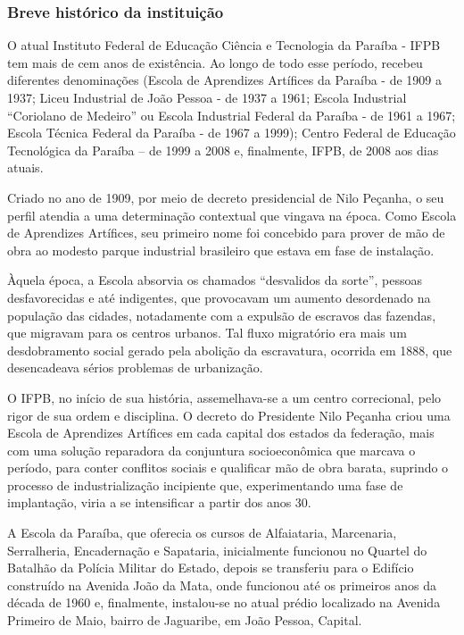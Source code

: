 \subsubsection{Breve hist\'orico da institui\c{c}\~ao}

	O atual Instituto Federal de Educação Ciência e Tecnologia da Paraíba - IFPB tem mais de cem anos de existência. Ao longo de todo esse período, recebeu diferentes denominações (Escola de Aprendizes Artífices da Paraíba - de 1909 a 1937; Liceu Industrial de João Pessoa - de 1937 a 1961; Escola Industrial ``Coriolano de Medeiro'' ou Escola Industrial Federal da Paraíba - de 1961 a 1967; Escola Técnica Federal da Paraíba - de 1967 a 1999); Centro Federal de Educação Tecnológica da Paraíba – de 1999 a 2008 e, finalmente, IFPB, de 2008 aos dias atuais.

	Criado no ano de 1909, por meio de decreto presidencial de Nilo Peçanha, o seu perfil atendia a uma determinação contextual que vingava na época. Como Escola de Aprendizes Artífices, seu primeiro nome foi concebido para prover de mão de obra ao modesto parque industrial brasileiro que estava em fase de instalação.

	Àquela época, a Escola absorvia os chamados ``desvalidos da sorte'', pessoas desfavorecidas e até indigentes, que provocavam um aumento desordenado na população das cidades, notadamente com a expulsão de escravos das fazendas, que migravam para os centros urbanos. Tal fluxo migratório era mais um desdobramento social gerado pela abolição da escravatura, ocorrida em 1888, que desencadeava sérios problemas de urbanização.

	O IFPB, no início de sua história, assemelhava-se a um centro correcional, pelo rigor de sua ordem e disciplina. O decreto do Presidente Nilo Peçanha criou uma Escola de Aprendizes Artífices em cada capital dos estados da federação, mais com uma solução reparadora da conjuntura socioeconômica que marcava o período, para conter conflitos sociais e qualificar mão de obra barata, suprindo o processo de industrialização incipiente que, experimentando uma fase de implantação, viria a se intensificar a partir dos anos 30.

	A Escola da Paraíba, que oferecia os cursos de Alfaiataria, Marcenaria, Serralheria, Encadernação e Sapataria, inicialmente funcionou no Quartel do Batalhão da Polícia Militar do Estado, depois se transferiu para o Edifício construído na Avenida João da Mata, onde funcionou até os primeiros anos da década de 1960 e, finalmente, instalou-se no atual prédio localizado na Avenida Primeiro de Maio, bairro de Jaguaribe, em João Pessoa, Capital.

